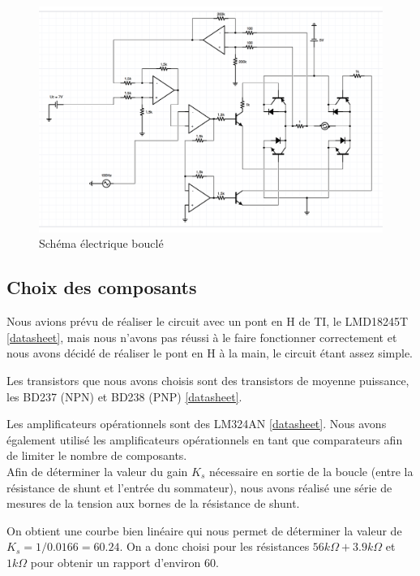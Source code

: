 \documentclass[a4paper]{article}
\begin{document}
\begin{figure}[H]
\centering
	\includegraphics[width=1\textwidth]{schema_boucle.png}
	\caption{Schéma électrique bouclé}
\end{figure}


\subsection{Choix des composants}

Nous avions prévu de réaliser le circuit avec un pont en H de TI, le LMD18245T \href{http://www.ti.com/lit/ds/symlink/lmd18245.pdf}{[datasheet]}, mais nous n'avons pas réussi à le faire fonctionner correctement et nous avons décidé de réaliser le pont en H à la main, le circuit étant assez simple.

Les transistors que nous avons choisis sont des transistors de moyenne puissance, les BD237 (NPN) et BD238 (PNP) \href{http://www.onsemi.com/pub_link/Collateral/BD237-D.PDF}{[datasheet]}.

Les amplificateurs opérationnels sont des LM324AN \href{https://www.fairchildsemi.com/datasheets/LM/LM324.pdf}{[datasheet]}. Nous avons également utilisé les amplificateurs opérationnels en tant que comparateurs afin de limiter le nombre de composants.\\

Afin de déterminer la valeur du gain $K_s$ nécessaire en sortie de la boucle (entre la résistance de shunt et l'entrée du sommateur), nous avons réalisé une série de mesures de la tension aux bornes de la résistance de shunt.

On obtient une courbe bien linéaire qui nous permet de déterminer la valeur de $K_s = 1/0.0166 = 60.24$. On a donc choisi pour les résistances $56k\Omega + 3.9k\Omega$ et $1k\Omega$ pour obtenir un rapport d'environ 60.
\end{document}
